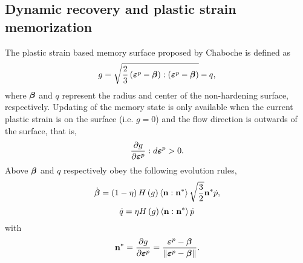\documentclass[preprint,5p,twocolumn,11pt,sort&compress]{elsarticle}
\newcommand{\bfepsilon}{{\mbox{\boldmath{$\varepsilon$}}}}
\newcommand{\bfbeta}{{\mbox{\boldmath{$\beta$}}}}
\newcommand{\bfn}{{\bf n}}
\begin{document}
\subsection{Dynamic recovery and plastic strain memorization}
\noindent
The plastic strain based memory surface proposed by Chaboche \cite{Chaboche1986149} is defined as
\begin{equation}
\label{Equ:g1}
g = \sqrt {\frac{2}{3}\left( {{\bfepsilon^p} - \bfbeta} \right):\left( {{\bfepsilon^p} - \bfbeta} \right)}  - q,
\end{equation}
where $\bfbeta$ and $q$ represent the radius and center of the non-hardening surface, respectively.
Updating of the memory state is only available when the current plastic strain is on the surface (i.e. $g=0$) and the flow direction is outwards of the surface, that is,
\[
\frac{{\partial g}}{{\partial {\bfepsilon^p}}}:d{\bfepsilon^p} > 0.
\]
Above $\bfbeta$ and $q$ respectively obey the following evolution rules,
\begin{equation}
\label{Equ:dotbeta1}
\dot\bfbeta  = \left( {1 - \eta } \right)H\left( g \right)\left\langle {\bfn:{\bfn^*}} \right\rangle \sqrt {\frac{3}{2}} {\bfn^*}\dot p,
\end{equation}
\begin{equation}
\label{Equ:dotq1}
\dot q = \eta H\left( g \right)\left\langle {\bfn:{\bfn^*}} \right\rangle \dot p
\end{equation}
with
\begin{equation}
\label{Equ:nstar}
{\bfn^*} = \frac{{\partial g}}{{\partial {\bfepsilon^p}}} = \frac{{{\bfepsilon^p} - \bfbeta}}{{\left\| {{\bfepsilon^p} - \bfbeta} \right\|}}.
\end{equation}
\end{document}
